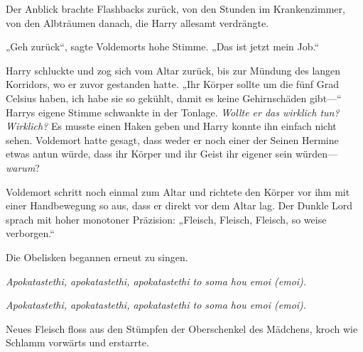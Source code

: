 Der Anblick brachte Flashbacks zurück, von den Stunden im Krankenzimmer, von den Albträumen danach, die Harry allesamt verdrängte.

„Geh zurück“, sagte Voldemorts hohe Stimme. „Das ist jetzt mein Job.“

Harry schluckte und zog sich vom Altar zurück, bis zur Mündung des langen Korridors, wo er zuvor gestanden hatte.
„Ihr Körper sollte um die fünf Grad Celsius haben, ich habe sie so gekühlt, damit es keine Gehirnschäden gibt—“ Harrys eigene Stimme schwankte in der Tonlage.
\emph{Wollte er das wirklich tun? Wirklich?}
Es musste einen Haken geben und Harry konnte ihn einfach nicht sehen. Voldemort hatte gesagt, dass weder er noch einer der Seinen Hermine etwas antun würde, dass ihr Körper und ihr Geist ihr eigener sein würden—\emph{warum}?

Voldemort schritt noch einmal zum Altar und richtete den Körper vor ihm mit einer Handbewegung so aus, dass er direkt vor dem Altar lag. Der Dunkle Lord sprach mit hoher monotoner Präzision:
„Fleisch, Fleisch, Fleisch, so weise verborgen.“

Die Obelisken begannen erneut zu singen.

\emph{Apokatastethi, apokatastethi, apokatastethi to soma hou emoi (emoi).}

\emph{Apokatastethi, apokatastethi, apokatastethi to soma hou emoi (emoi).}

Neues Fleisch floss aus den Stümpfen der Oberschenkel des Mädchens, kroch wie Schlamm vorwärts und erstarrte.

